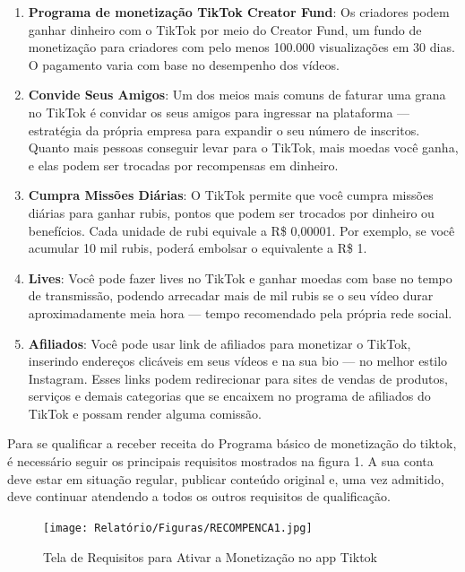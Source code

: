 \begin{enumerate}
    \item \textbf{Programa de monetização TikTok Creator Fund}: Os criadores podem ganhar dinheiro com o TikTok por meio do Creator Fund, um fundo de monetização para criadores com pelo menos 100.000 visualizações em 30 dias. O pagamento varia com base no desempenho dos vídeos.

\item \textbf{Convide Seus Amigos}: Um dos meios mais comuns de faturar uma grana no TikTok é convidar os seus amigos para ingressar na plataforma — estratégia da própria empresa para expandir o seu número de inscritos. Quanto mais pessoas conseguir levar para o TikTok, mais moedas você ganha, e elas podem ser trocadas por recompensas em dinheiro.

\item \textbf{Cumpra Missões Diárias}: O TikTok permite que você cumpra missões diárias para ganhar rubis, pontos que podem ser trocados por dinheiro ou benefícios. Cada unidade de rubi equivale a R\$ 0,00001. Por exemplo, se você acumular 10 mil rubis, poderá embolsar o equivalente a R\$ 1.

\item \textbf{Lives}:
Você pode fazer lives no TikTok e ganhar moedas com base no tempo de transmissão, podendo arrecadar mais de mil rubis se o seu vídeo durar aproximadamente meia hora — tempo recomendado pela própria rede social.

\item \textbf{Afiliados}: Você pode usar link de afiliados para monetizar o TikTok, inserindo endereços clicáveis em seus vídeos e na sua bio — no melhor estilo Instagram. Esses links podem redirecionar para sites de vendas de produtos, serviços e demais categorias que se encaixem no programa de afiliados do TikTok e possam render alguma comissão.
\end{enumerate}


Para se qualificar a receber receita do Programa básico de monetização do tiktok, é necessário seguir os principais requisitos mostrados na figura 1. A sua conta deve estar em situação regular, publicar conteúdo original e, uma vez admitido, deve continuar atendendo a todos os outros requisitos de qualificação.


\begin{figure}[H]
    \centering
    \texttt{[image: Relatório/Figuras/RECOMPENCA1.jpg]}
    \caption{Tela de Requisitos para Ativar a Monetização no app Tiktok}
    \label{fig:enter-label2} 
\end{figure}

